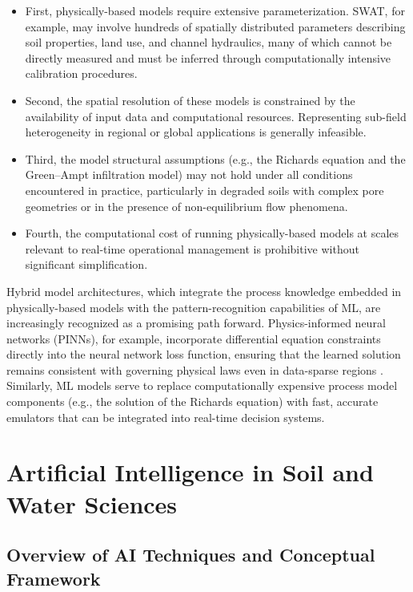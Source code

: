 \documentclass[land,review,accept,pdftex,oneauthor]{Definitions/mdpi}
\begin{document}
\begin{itemize}
    \item First, physically-based models require extensive parameterization. SWAT, for example, may involve hundreds of spatially distributed parameters describing soil properties, land use, and channel hydraulics, many of which cannot be directly measured and must be inferred through computationally intensive calibration procedures.
    \item Second, the spatial resolution of these models is constrained by the availability of input data and computational resources. Representing sub-field heterogeneity in regional or global applications is generally infeasible.    
    \item Third, the model structural assumptions (e.g., the Richards equation and the Green--Ampt infiltration model) may not hold under all conditions encountered in practice, particularly in degraded soils with complex pore geometries or in the presence of non-equilibrium flow phenomena.    
    \item Fourth, the computational cost of running physically-based models at scales relevant to real-time operational management is prohibitive without significant simplification.
\end{itemize}

Hybrid model architectures, which integrate the process knowledge embedded in physically-based models with the pattern-recognition capabilities of ML, are increasingly recognized as a promising path forward. Physics-informed neural networks (PINNs), for example, incorporate differential equation constraints directly into the neural network loss function, ensuring that the learned solution remains consistent with governing physical laws even in data-sparse regions \citep{raissi2019physics}. Similarly, ML models {serve to replace} computationally expensive process model components (e.g., the solution of the Richards equation) with fast, accurate emulators that can be integrated into real-time decision systems.


\section{{Artificial Intelligence in Soil and Water Sciences}}\label{sec3}

\subsection{Overview of AI Techniques and Conceptual Framework}
\end{document}
